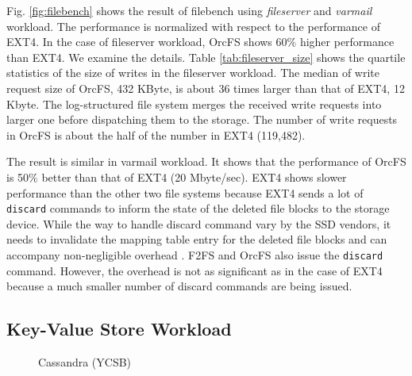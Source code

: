 \documentclass[pageno]{jpaper}
\begin{document}
Fig. \ref{fig:filebench} shows the result of filebench
\cite{filebench} using \emph{fileserver} and \emph{varmail} workload.
The performance is normalized with respect to the performance of EXT4.
In the case of fileserver workload, OrcFS shows 60$\%$ higher
performance than EXT4.  We examine the details. Table
\ref{tab:fileserver_size} shows the quartile statistics of the size of
writes in the fileserver workload.  The median of write request size
of OrcFS, 432 KByte, is about 36 times larger than that of EXT4, 12
Kbyte. The log-structured file system merges the received write
requests into larger one before dispatching them to the storage.  The
number of write requests in OrcFS is about the half of the number in
EXT4 (119,482).


The result is similar in varmail workload. It shows that the
performance of OrcFS is 50$\%$ better than that of EXT4 (20
Mbyte/sec). EXT4 shows slower performance than the other two file
systems because EXT4 sends a lot of \texttt{discard} commands to inform
the state of the deleted file blocks to the storage device. While the
way to handle discard command vary by the SSD vendors, it needs to
invalidate the mapping table entry for the deleted file blocks and can
accompany non-negligible overhead \cite{saxena2010flashvm}.  F2FS and
OrcFS also issue the \texttt{discard} command.
However, the overhead is not as significant as in the case of EXT4
because a much smaller number of discard commands are being issued.



\subsection{Key-Value Store Workload}
\label{subsec:ycsb_bench}

\begin{figure}[t]
  \centering
   \caption{Cassandra (YCSB)\label{fig:ycsb}}
\end{figure}
\end{document}
